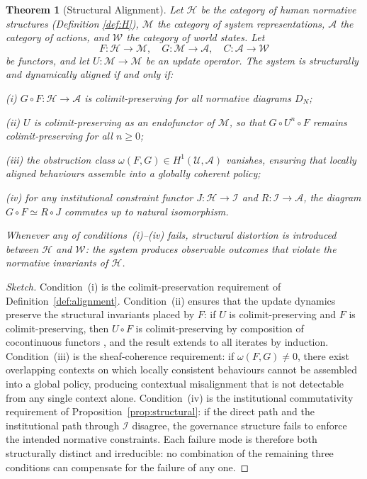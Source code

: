 \documentclass[12pt]{article}
\newtheorem{theorem}{Theorem}[section]
\theoremstyle{definition}
\begin{document}
\begin{theorem}[Structural Alignment]
\label{thm:structural}
Let $\mathcal{H}$ be the category of human normative structures (Definition
\ref{def:H}), $\mathcal{M}$ the category of system representations,
$\mathcal{A}$ the category of actions, and $\mathcal{W}$ the category of world
states. Let
\begin{equation*}
  F : \mathcal{H} \to \mathcal{M}, \quad
  G : \mathcal{M} \to \mathcal{A}, \quad
  C : \mathcal{A} \to \mathcal{W}
\end{equation*}
be functors, and let $U : \mathcal{M} \to \mathcal{M}$ be an update operator.
The system is \emph{structurally and dynamically aligned} if and only if:

\noindent (i) $G \circ F : \mathcal{H} \to \mathcal{A}$ is colimit-preserving
for all normative diagrams $D_N$;

\noindent (ii) $U$ is colimit-preserving as an endofunctor of $\mathcal{M}$,
so that $G \circ U^n \circ F$ remains colimit-preserving for all $n \geq 0$;

\noindent (iii) the obstruction class $\omega(F, G) \in H^1(\mathcal{U},
\mathcal{A})$ vanishes, ensuring that locally aligned behaviours assemble
into a globally coherent policy;

\noindent (iv) for any institutional constraint functor $J : \mathcal{H} \to
\mathcal{I}$ and $R : \mathcal{I} \to \mathcal{A}$, the diagram $G \circ F
\simeq R \circ J$ commutes up to natural isomorphism.

Whenever any of conditions~(i)--(iv) fails, structural distortion is introduced
between $\mathcal{H}$ and $\mathcal{W}$: the system produces observable outcomes
that violate the normative invariants of $\mathcal{H}$.
\end{theorem}

\begin{proof}[Sketch]
Condition~(i) is the colimit-preservation requirement of Definition~\ref{def:alignment}.
Condition~(ii) ensures that the update dynamics preserve the structural
invariants placed by $F$: if $U$ is colimit-preserving and $F$ is
colimit-preserving, then $U \circ F$ is colimit-preserving by composition of
cocontinuous functors \citep{maclane1998}, and the result extends to all
iterates by induction. Condition~(iii) is the sheaf-coherence requirement: if
$\omega(F, G) \neq 0$, there exist overlapping contexts on which locally
consistent behaviours cannot be assembled into a global policy, producing
contextual misalignment that is not detectable from any single context alone.
Condition~(iv) is the institutional commutativity requirement of
Proposition~\ref{prop:structural}: if the direct path and the institutional
path through $\mathcal{I}$ disagree, the governance structure fails to enforce
the intended normative constraints. Each failure mode is therefore both
structurally distinct and irreducible: no combination of the remaining three
conditions can compensate for the failure of any one.
\end{proof}
\end{document}
